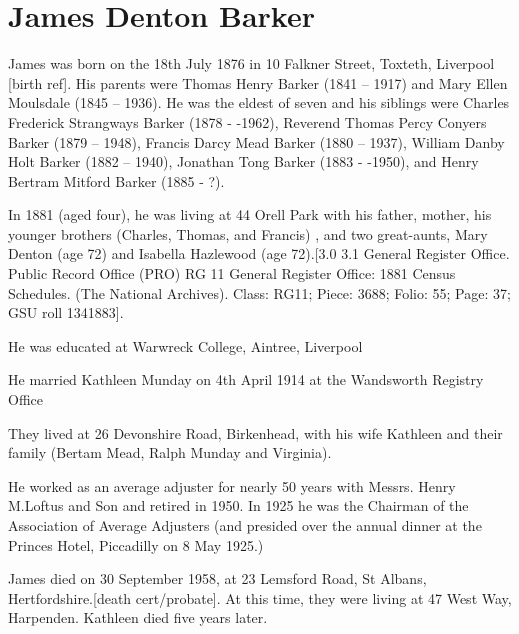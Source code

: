 \section{James Denton Barker}\label{James_Denton_Barker}

James was born on the 18th July 1876 in 10 Falkner Street, Toxteth, Liverpool [birth ref]. His parents were  Thomas Henry Barker (1841 -- 1917) and Mary Ellen Moulsdale (1845 -- 1936). He was the eldest of seven and his siblings were Charles Frederick Strangways Barker (1878 - -1962),  Reverend Thomas Percy Conyers Barker (1879 -- 1948), Francis Darcy Mead Barker (1880 -- 1937), William Danby Holt Barker (1882 -- 1940), Jonathan Tong Barker (1883 - -1950), and Henry Bertram Mitford Barker (1885 - ?).  

 In 1881 (aged four), he was living at 44 Orell Park with his father, mother, his younger brothers (Charles, Thomas, and Francis) , and two great-aunts, Mary Denton (age 72) and Isabella Hazlewood (age 72).[3.0 3.1 General Register Office. Public Record Office (PRO) RG 11 General Register Office: 1881 Census Schedules. (The National Archives). Class: RG11; Piece: 3688; Folio: 55; Page: 37; GSU roll 1341883].

He was educated at Warwreck College, Aintree, Liverpool

He married Kathleen Munday on 4th April 1914 at the Wandsworth Registry Office

They lived at 26 Devonshire Road, Birkenhead, with his wife Kathleen and their family (Bertam Mead, Ralph Munday and Virginia).

He worked as an average adjuster for nearly 50 years with Messrs. Henry M.Loftus and Son and retired in 1950. In 1925 he was the Chairman of the Association of Average Adjusters (and presided over the annual dinner at the Princes Hotel, Piccadilly on 8 May 1925.)

James died on 30 September 1958, at 23 Lemsford Road, St Albans, Hertfordshire.[death cert/probate]. At this time, they were living at 47 West Way, Harpenden. Kathleen died five years later.




